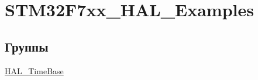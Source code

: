 \hypertarget{group___s_t_m32_f7xx___h_a_l___examples}{
\section{STM32F7xx\_\-HAL\_\-Examples}
\label{group___s_t_m32_f7xx___h_a_l___examples}
}
\subsection*{Группы}
\begin{CompactItemize}
\item 
\hyperlink{group___h_a_l___time_base}{HAL\_\-TimeBase}
\end{CompactItemize}
